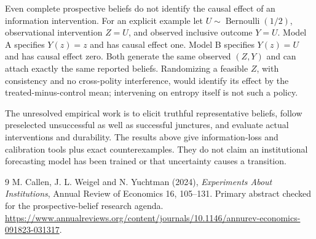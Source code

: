 \documentclass[11pt,a4paper]{article}
\begin{document}
Even complete prospective beliefs do not identify the causal effect of an information intervention. For an explicit example let $U\sim\operatorname{Bernoulli}(1/2)$, observational intervention $Z=U$, and observed inclusive outcome $Y=U$. Model A specifies $Y(z)=z$ and has causal effect one. Model B specifies $Y(z)=U$ and has causal effect zero. Both generate the same observed $(Z,Y)$ and can attach exactly the same reported beliefs. Randomizing a feasible $Z$, with consistency and no cross-polity interference, would identify its effect by the treated-minus-control mean; intervening on entropy itself is not such a policy.

The unresolved empirical work is to elicit truthful representative beliefs, follow preselected unsuccessful as well as successful junctures, and evaluate actual interventions and durability. The results above give information-loss and calibration tools plus exact counterexamples. They do not claim an institutional forecasting model has been trained or that uncertainty causes a transition.

\begin{thebibliography}{9}
 M. Callen, J. L. Weigel and N. Yuchtman (2024), \emph{Experiments About Institutions}, Annual Review of Economics 16, 105--131. Primary abstract checked for the prospective-belief research agenda. \url{https://www.annualreviews.org/content/journals/10.1146/annurev-economics-091823-031317}.
\end{thebibliography}
\end{document}
